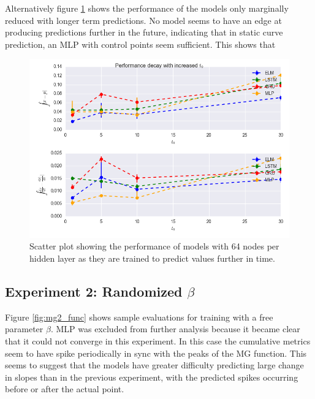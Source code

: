 \documentclass[11pt]{article}
\begin{document}
Alternatively figure \ref{fig:mg1_save} shows the performance of the models only
marginally reduced with longer term predictions. No model seems to
have an edge at producing predictions further in the future,
indicating that in static curve prediction, an MLP with control points
seem sufficient. This shows that 

  \begin{figure}
    \begin{center}
   \includegraphics[width=.96\textwidth]{figures/mg1_save.png}
       
    \caption{Scatter plot showing the performance of models with 64 nodes
      per hidden layer as they are trained to predict values further
      in time.}
    \label{fig:mg1_save}
    \end{center}
  \end{figure}


 \subsection {Experiment 2: Randomized $\beta$}
Figure \ref{fig:mg2_func} shows sample evaluations for training with a
free parameter $\beta$. MLP was excluded from further analysis because
it became clear that it could not converge in this experiment. In this
case the cumulative metrics seem to have spike periodically in sync
with the peaks of the MG function. This seems to suggest that the
models have greater difficulty predicting large change in slopes than
in the previous experiment, with the predicted spikes occurring before
or after the actual point.
\end{document}
